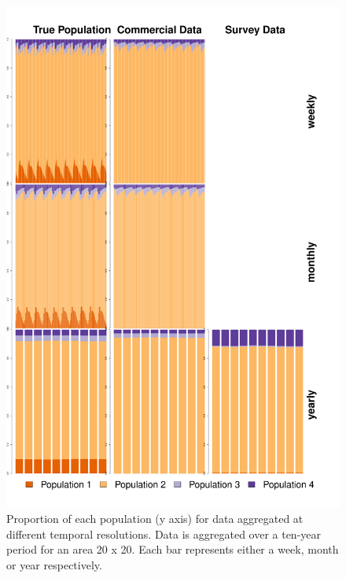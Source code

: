 \documentclass[review]{elsarticle}
\begin{document}
\begin{figure}[!ht]
	\includegraphics[width=\linewidth]{../analysis/Data_Aggregation_time_Rev2}
	\caption{Proportion of each population (y axis) for data aggregated at
		different temporal resolutions. Data is aggregated over a
		ten-year period for an area 20 x 20. Each bar represents either
		a week, month or year respectively.}
	\label{fig:2}
\end{figure}	
\end{document}
